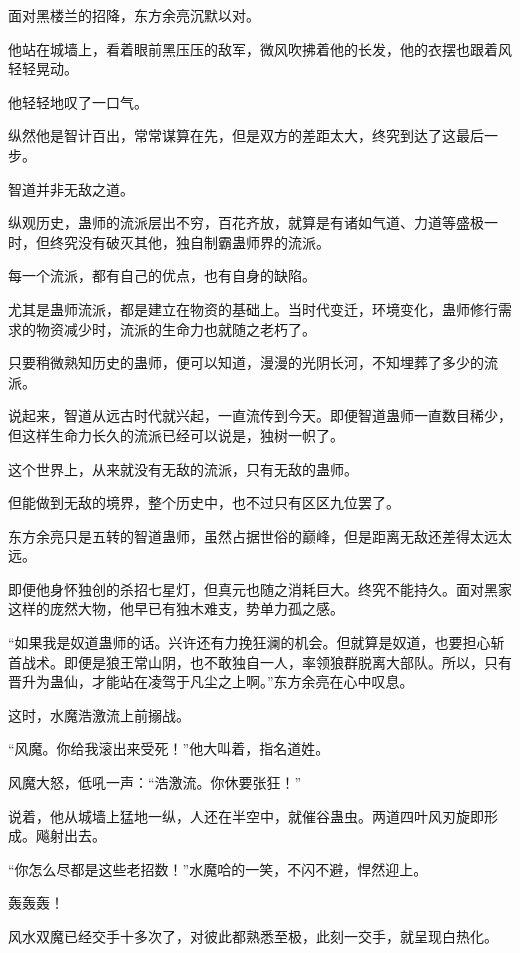 
\begin{this_body}

面对黑楼兰的招降，东方余亮沉默以对。

他站在城墙上，看着眼前黑压压的敌军，微风吹拂着他的长发，他的衣摆也跟着风轻轻晃动。

他轻轻地叹了一口气。

纵然他是智计百出，常常谋算在先，但是双方的差距太大，终究到达了这最后一步。

智道并非无敌之道。

纵观历史，蛊师的流派层出不穷，百花齐放，就算是有诸如气道、力道等盛极一时，但终究没有破灭其他，独自制霸蛊师界的流派。

每一个流派，都有自己的优点，也有自身的缺陷。

尤其是蛊师流派，都是建立在物资的基础上。当时代变迁，环境变化，蛊师修行需求的物资减少时，流派的生命力也就随之老朽了。

只要稍微熟知历史的蛊师，便可以知道，漫漫的光阴长河，不知埋葬了多少的流派。

说起来，智道从远古时代就兴起，一直流传到今天。即便智道蛊师一直数目稀少，但这样生命力长久的流派已经可以说是，独树一帜了。

这个世界上，从来就没有无敌的流派，只有无敌的蛊师。

但能做到无敌的境界，整个历史中，也不过只有区区九位罢了。

东方余亮只是五转的智道蛊师，虽然占据世俗的巅峰，但是距离无敌还差得太远太远。

即便他身怀独创的杀招七星灯，但真元也随之消耗巨大。终究不能持久。面对黑家这样的庞然大物，他早已有独木难支，势单力孤之感。

“如果我是奴道蛊师的话。兴许还有力挽狂澜的机会。但就算是奴道，也要担心斩首战术。即便是狼王常山阴，也不敢独自一人，率领狼群脱离大部队。所以，只有晋升为蛊仙，才能站在凌驾于凡尘之上啊。”东方余亮在心中叹息。

这时，水魔浩激流上前搦战。

“风魔。你给我滚出来受死！”他大叫着，指名道姓。

风魔大怒，低吼一声：“浩激流。你休要张狂！”

说着，他从城墙上猛地一纵，人还在半空中，就催谷蛊虫。两道四叶风刃旋即形成。飚射出去。

“你怎么尽都是这些老招数！”水魔哈的一笑，不闪不避，悍然迎上。

轰轰轰！

风水双魔已经交手十多次了，对彼此都熟悉至极，此刻一交手，就呈现白热化。


\end{this_body}
